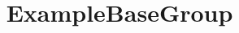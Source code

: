 \documentclass{test}
\begin{document}
\title{ExampleBaseGroup} \maketitle \noindent




\end{document}
